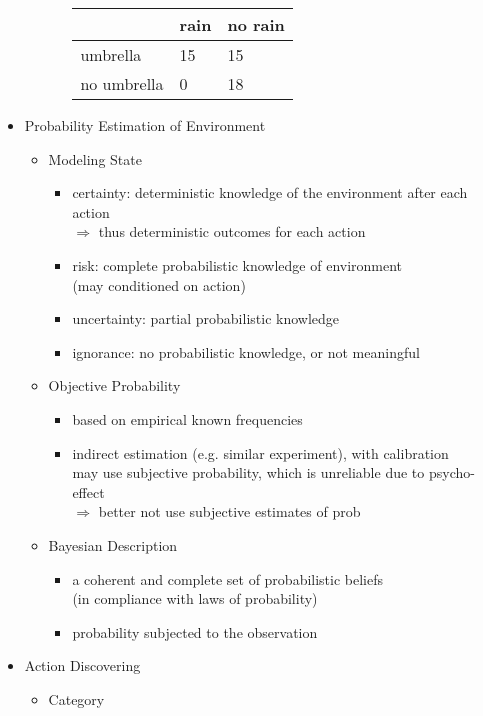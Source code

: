\begin{itemize}
\begin{itemize}
\begin{itemize}
		\begin{tabular*}{0.5\linewidth}{l|ll}
			            & rain       & no rain    \\
			\hline
			umbrella    & 15 & 15 \\
			no umbrella & 0  & 18
		\end{tabular*}
		\end{itemize}
	\end{itemize}
\item Probability Estimation of Environment
	\begin{itemize}
	\item Modeling State
		\begin{itemize}
		\item certainty: deterministic knowledge of the environment after each action \\
		$\Rightarrow$ thus deterministic outcomes for each action
		\item risk: complete probabilistic knowledge of environment \\
		(may conditioned on action)
		\item uncertainty: partial probabilistic knowledge
		\item ignorance: no probabilistic knowledge, or not meaningful
		\end{itemize}
	\item Objective Probability
		\begin{itemize}
		\item based on empirical known frequencies
		\item indirect estimation (e.g. similar experiment), with calibration \\
		may use subjective probability, which is unreliable due to psycho-effect \\
		$\Rightarrow$ better not use subjective estimates of prob
		\end{itemize}
	\item Bayesian Description
		\begin{itemize}
		\item a coherent and complete set of probabilistic beliefs \\
		(in compliance with laws of probability)
		\item probability subjected to the observation
		\end{itemize}		
	\end{itemize}
\item Action Discovering
	\begin{itemize}
	\item Category

\end{itemize}
\end{itemize}
